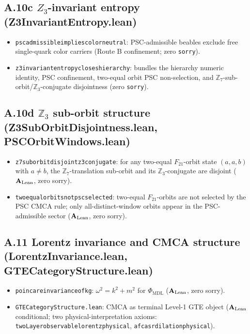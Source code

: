 \documentclass[11pt]{article}
\theoremstyle{remark}
\newcommand{\PHIMDL}{\Phi_{\mathrm{MDL}}}
\newcommand{\lean}[1]{%
  \penalty-100
  \begingroup\def\_{\textunderscore\allowbreak}\texttt{#1}\endgroup}
\newcommand{\CatAL}{\ensuremath{\textbf{A}_{\rm Lean}}}
\begin{document}
\begin{appendices}
\subsection*{A.10c $Z_3$-invariant entropy (Z3InvariantEntropy.lean)}

\begin{itemize}[noitemsep]
\item \lean{psc\_admissible\_implies\_color\_neutral}: PSC-admissible beables
  exclude free single-quark color carriers (Route B confinement;
  zero \texttt{sorry}).
\item \lean{z3\_invariant\_entropy\_closes\_hierarchy}: bundles the hierarchy
  numeric identity, PSC confinement, two-equal orbit PSC non-selection, and
  $\mathbb{Z}_7$-sub-orbit/$\mathbb{Z}_3$-conjugate disjointness (zero \texttt{sorry}).
\end{itemize}

\subsection*{A.10d $\mathbb{Z}_3$ sub-orbit structure (Z3SubOrbitDisjointness.lean, PSCOrbitWindows.lean)}

\begin{itemize}[noitemsep]
\item \lean{z7\_suborbit\_disjoint\_z3\_conjugate}: for any two-equal $F_{21}$-orbit
  state $(a,a,b)$ with $a\neq b$, the $\mathbb{Z}_7$-translation sub-orbit and its
  $\mathbb{Z}_3$-conjugate are disjoint ($\CatAL$, zero sorry).
\item \lean{two\_equal\_orbits\_not\_psc\_selected}: two-equal $F_{21}$-orbits are not
  selected by the PSC CMCA rule; only all-distinct-window orbits appear in the
  PSC-admissible sector ($\CatAL$, zero sorry).
\end{itemize}

\subsection*{A.11 Lorentz invariance and CMCA structure (LorentzInvariance.lean, GTECategoryStructure.lean)}

\begin{itemize}[noitemsep]
\item \lean{poincare\_invariance\_of\_kg}: $\omega^2 = k^2 + m^2$ for $\PHIMDL$
  ($\CatAL$, zero sorry).
\item \lean{GTECategoryStructure.lean}: CMCA as terminal Level-1 GTE object
  ($\CatAL$ conditional; two physical-interpretation axioms:
  \lean{twoLayer\_observable\_lorentz\_physical}, \lean{afca\_sr\_dilation\_physical}).
\end{itemize}


\end{appendices}
\end{document}
